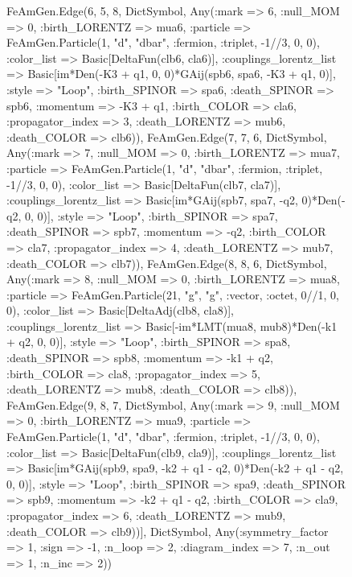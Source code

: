 \documentclass{revtex4}
\begin{document}
\begin{figure}[!htb]
\begin{center}
{FeAmGen.Edge(6, 5, 8, Dict{Symbol, Any}(:mark => 6, :null_MOM => 0, :birth_LORENTZ => mua6, :particle => FeAmGen.Particle(1, "d", "dbar", :fermion, :triplet, -1//3, 0, 0), :color_list => Basic[DeltaFun(clb6, cla6)], :couplings_lorentz_list => Basic[im*Den(-K3 + q1, 0, 0)*GAij(spb6, spa6, -K3 + q1, 0)], :style => "Loop", :birth_SPINOR => spa6, :death_SPINOR => spb6, :momentum => -K3 + q1, :birth_COLOR => cla6, :propagator_index => 3, :death_LORENTZ => mub6, :death_COLOR => clb6)), FeAmGen.Edge(7, 7, 6, Dict{Symbol, Any}(:mark => 7, :null_MOM => 0, :birth_LORENTZ => mua7, :particle => FeAmGen.Particle(1, "d", "dbar", :fermion, :triplet, -1//3, 0, 0), :color_list => Basic[DeltaFun(clb7, cla7)], :couplings_lorentz_list => Basic[im*GAij(spb7, spa7, -q2, 0)*Den(-q2, 0, 0)], :style => "Loop", :birth_SPINOR => spa7, :death_SPINOR => spb7, :momentum => -q2, :birth_COLOR => cla7, :propagator_index => 4, :death_LORENTZ => mub7, :death_COLOR => clb7)), FeAmGen.Edge(8, 8, 6, Dict{Symbol, Any}(:mark => 8, :null_MOM => 0, :birth_LORENTZ => mua8, :particle => FeAmGen.Particle(21, "g", "g", :vector, :octet, 0//1, 0, 0), :color_list => Basic[DeltaAdj(clb8, cla8)], :couplings_lorentz_list => Basic[-im*LMT(mua8, mub8)*Den(-k1 + q2, 0, 0)], :style => "Loop", :birth_SPINOR => spa8, :death_SPINOR => spb8, :momentum => -k1 + q2, :birth_COLOR => cla8, :propagator_index => 5, :death_LORENTZ => mub8, :death_COLOR => clb8)), FeAmGen.Edge(9, 8, 7, Dict{Symbol, Any}(:mark => 9, :null_MOM => 0, :birth_LORENTZ => mua9, :particle => FeAmGen.Particle(1, "d", "dbar", :fermion, :triplet, -1//3, 0, 0), :color_list => Basic[DeltaFun(clb9, cla9)], :couplings_lorentz_list => Basic[im*GAij(spb9, spa9, -k2 + q1 - q2, 0)*Den(-k2 + q1 - q2, 0, 0)], :style => "Loop", :birth_SPINOR => spa9, :death_SPINOR => spb9, :momentum => -k2 + q1 - q2, :birth_COLOR => cla9, :propagator_index => 6, :death_LORENTZ => mub9, :death_COLOR => clb9))], Dict{Symbol, Any}(:symmetry_factor => 1, :sign => -1, :n_loop => 2, :diagram_index => 7, :n_out => 1, :n_inc => 2)) 
}
\end{center}
\end{figure}
\end{document}
